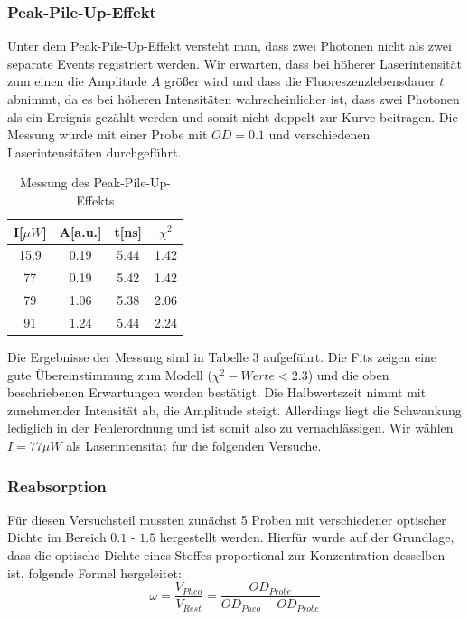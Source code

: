 \documentclass{article}
\begin{document}
\subsubsection{Peak-Pile-Up-Effekt}
Unter dem Peak-Pile-Up-Effekt versteht man, dass zwei Photonen nicht als zwei separate Events registriert werden. Wir erwarten,
dass bei höherer Laserintensität zum einen die Amplitude $A$ größer wird und dass die Fluoreszenzlebensdauer $t$ abnimmt, da es bei
höheren Intensitäten wahrscheinlicher ist, dass zwei Photonen als ein Ereignis gezählt werden und somit nicht doppelt zur Kurve beitragen.
Die Messung wurde mit einer Probe mit $OD = 0.1$ und verschiedenen Laserintensitäten durchgeführt.

\begin{table}[h]
  \centering
  \begin{tabular}{c|c|c|c}
    I[$\mu W$]      & A[a.u.]  & t[ns]             & $\chi^2$\\
    \hline
    15.9            &  0.19    & 5.44              & 1.42    \\
    77              &  0.19    & 5.42              & 1.42    \\
    79              &  1.06    & 5.38              & 2.06    \\
    91              &  1.24    & 5.44              & 2.24    \\
  \end{tabular}
  \caption{Messung des Peak-Pile-Up-Effekts}
\end{table}


Die Ergebnisse der Messung sind in Tabelle 3 aufgeführt. Die Fits zeigen eine gute Übereinstimmung zum Modell ($\chi^2-Werte < 2.3$)
und die oben beschriebenen Erwartungen werden bestätigt. Die Halbwertszeit nimmt mit zunehmender Intensität ab, die Amplitude steigt.
Allerdings liegt die Schwankung lediglich in der Fehlerordnung und ist somit also zu vernachlässigen. Wir wählen $I = 77 \mu W$ als
Laserintensität für die folgenden Versuche.



\subsubsection{Reabsorption}
Für diesen Versuchsteil mussten zunächst 5 Proben mit verschiedener optischer Dichte im Bereich
$0.1$ - $1.5$ hergestellt werden. Hierfür wurde auf der Grundlage, dass die optische Dichte eines Stoffes
proportional zur Konzentration desselben ist, folgende Formel hergeleitet:
\begin{equation}
  \omega = \frac{V_{Pheo}}{V_{Rest}}=\frac{OD_{Probe}}{OD_{Pheo}-OD_{Probe}}
\end{equation}
\end{document}
